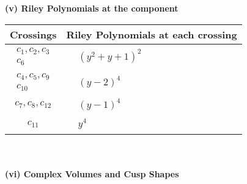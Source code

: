 \documentclass[1p]{elsarticle_modified}
\theoremstyle{definition}
\begin{document}
\newpage\renewcommand{\arraystretch}{1}
\flushleft \textbf{(v) Riley Polynomials at the component}\newline \\
\begin{tabular}{m{50pt}|m{274pt}}
Crossings & \hspace{64pt}Riley Polynomials at each crossing \\
\hline $$\begin{aligned}c_{1},c_{2},c_{3}\\c_{6}\end{aligned}$$&$\begin{aligned}
&(y^2+y+1)^2
\end{aligned}$\\
\hline $$\begin{aligned}c_{4},c_{5},c_{9}\\c_{10}\end{aligned}$$&$\begin{aligned}
&(y-2)^4
\end{aligned}$\\
\hline $$\begin{aligned}c_{7},c_{8},c_{12}\end{aligned}$$&$\begin{aligned}
&(y-1)^4
\end{aligned}$\\
\hline $$\begin{aligned}c_{11}\end{aligned}$$&$\begin{aligned}
&y^4
\end{aligned}$\\
\hline
\end{tabular}\\~\\
\newpage\flushleft \textbf{(vi) Complex Volumes and Cusp Shapes}
\end{document}
